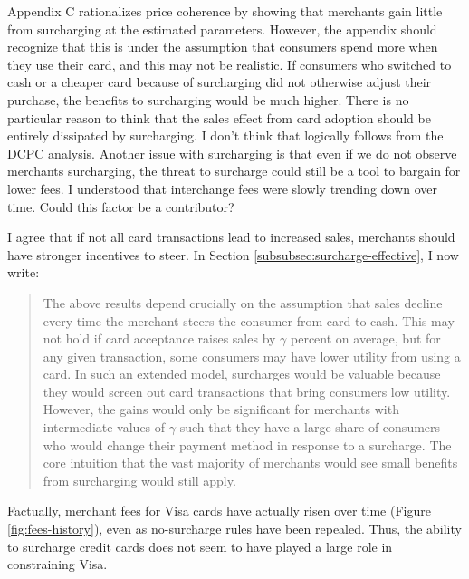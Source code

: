 \documentclass[main.tex]{subfiles}
\begin{document}
\begin{refsection}
\begin{refcomment}
Appendix C rationalizes price coherence by showing that merchants gain little from surcharging at the estimated parameters.
However, the appendix should recognize that this is under the assumption that consumers spend more when they use their card, and this may not be realistic.
If consumers who switched to cash or a cheaper card because of surcharging did not otherwise adjust their purchase, the benefits to surcharging would be much higher.
There is no particular reason to think that the sales effect from card adoption should be entirely dissipated by surcharging.
I don't think that logically follows from the DCPC analysis.
Another issue with surcharging is that even if we do not observe merchants surcharging, the threat to surcharge could still be a tool to bargain for lower fees.
I understood that interchange fees were slowly trending down over time.
Could this factor be a contributor?
\end{refcomment}

I agree that if not all card transactions lead to increased sales, merchants should have stronger incentives to steer.
In Section \ref{subsubsec:surcharge-effective}, I now write:

\begin{quote}
    The above results depend crucially on the assumption that sales decline every time the merchant steers the consumer from card to cash.
This may not hold if card acceptance raises sales by $\gamma$ percent on average, but for any given transaction, some consumers may have lower utility from using a card.
In such an extended model, surcharges would be valuable because they would screen out card transactions that bring consumers low utility.
However, the gains would only be significant for merchants with intermediate values of $\gamma$ such that they have a large share of consumers who would change their payment method in response to a surcharge.
The core intuition that the vast majority of merchants would see small benefits from surcharging would still apply.
\end{quote}

Factually, merchant fees for Visa cards have actually risen over time (Figure \ref{fig:fees-history}), even as no-surcharge rules have been repealed.
Thus, the ability to surcharge credit cards does not seem to have played a large role in constraining Visa.


\end{refsection}
\end{document}
